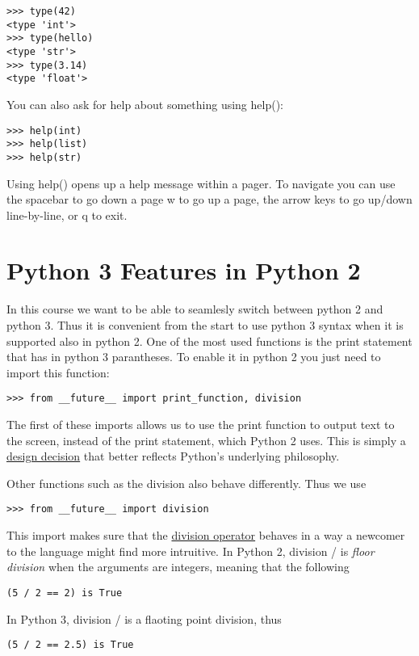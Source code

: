\begin{lstlisting}
>>> type(42)
<type 'int'>
>>> type(hello)
<type 'str'>
>>> type(3.14)
<type 'float'>
\end{lstlisting}


You can also ask for help about something using help():

\begin{lstlisting}
>>> help(int)
>>> help(list)
>>> help(str)
\end{lstlisting}

Using help() opens up a help message within a pager. To navigate you
can use the spacebar to go down a page w to go up a page, the arrow
keys to go up/down line-by-line, or q to exit.

\section{Python 3 Features in Python 2}\label{python-3-features-in-python-2}

In this course we want to be able to seamlesly switch between python 2
and python 3. Thus it is convenient from the start to use python 3
syntax when it is supported also in python 2. One of the most used
functions is the print statement that has in python 3 parantheses. To
enable it in python 2 you just need to import this function:

\begin{lstlisting}
>>> from __future__ import print_function, division
\end{lstlisting}

The first of these imports allows us to use the print function to output
text to the screen, instead of the print statement, which Python 2 uses.
This is simply a \href{https://www.python.org/dev/peps/pep-3105/}{design
decision} that better reflects Python's underlying philosophy.


Other functions such as the division also behave differently. Thus we use

\begin{lstlisting}
>>> from __future__ import division
\end{lstlisting}

This import makes sure that the
\href{https://www.python.org/dev/peps/pep-0238/}{division operator}
behaves in a way a newcomer to the language might find more
intruitive.  In Python 2, division / is \emph{floor division} when the
arguments are integers, meaning that the following 

\begin{lstlisting}
(5 / 2 == 2) is True
\end{lstlisting}

In Python 3, division / is a flaoting point division, thus 

\begin{lstlisting}
(5 / 2 == 2.5) is True
\end{lstlisting}